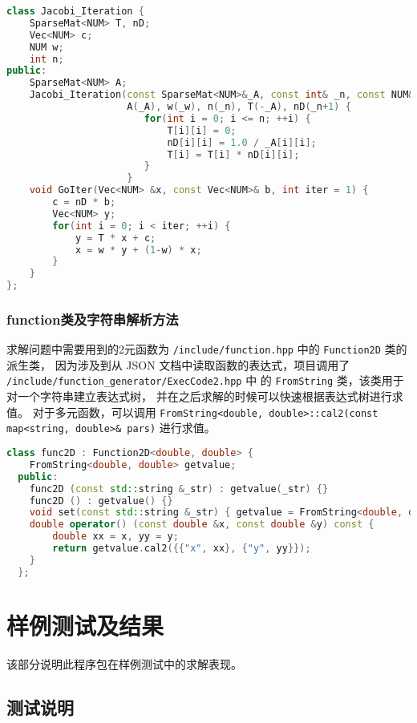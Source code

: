\documentclass[lang=cn,a4paper,newtx,bibend=bibtex]{elegantpaper}
\begin{document}
\begin{lstlisting}[language=C++]
class Jacobi_Iteration {
    SparseMat<NUM> T, nD;
    Vec<NUM> c;
    NUM w;
    int n;
public:
    SparseMat<NUM> A;
    Jacobi_Iteration(const SparseMat<NUM>&_A, const int& _n, const NUM& _w = 2.0/3.0) : 
                     A(_A), w(_w), n(_n), T(-_A), nD(_n+1) {
                        for(int i = 0; i <= n; ++i) {
                            T[i][i] = 0;
                            nD[i][i] = 1.0 / _A[i][i];
                            T[i] = T[i] * nD[i][i];
                        }
                     }
    void GoIter(Vec<NUM> &x, const Vec<NUM>& b, int iter = 1) {
        c = nD * b;
        Vec<NUM> y;
        for(int i = 0; i < iter; ++i) {
            y = T * x + c;
            x = w * y + (1-w) * x;
        }
    }
};
\end{lstlisting}

\subsubsection{function类及字符串解析方法}

求解问题中需要用到的2元函数为 \texttt{/include/function.hpp} 中的 \texttt{Function2D} 类的派生类，
因为涉及到从 JSON 文档中读取函数的表达式，项目调用了 \texttt{/include/function\_generator/ExecCode2.hpp} 中
的 \texttt{FromString} 类，该类用于对一个字符串建立表达式树，
并在之后求解的时候可以快速根据表达式树进行求值。
对于多元函数，可以调用 \texttt{FromString<double, double>::cal2(const map<string, double>\& pars)} 进行求值。

\begin{lstlisting}[language = C++]
  class func2D : Function2D<double, double> {
    FromString<double, double> getvalue;
  public:
    func2D (const std::string &_str) : getvalue(_str) {}
    func2D () : getvalue() {}
    void set(const std::string &_str) { getvalue = FromString<double, double>(_str); }
    double operator() (const double &x, const double &y) const {
        double xx = x, yy = y;
        return getvalue.cal2({{"x", xx}, {"y", yy}});
    }
  };
\end{lstlisting}

\section{样例测试及结果}

该部分说明此程序包在样例测试中的求解表现。

\subsection{测试说明}
\end{document}
